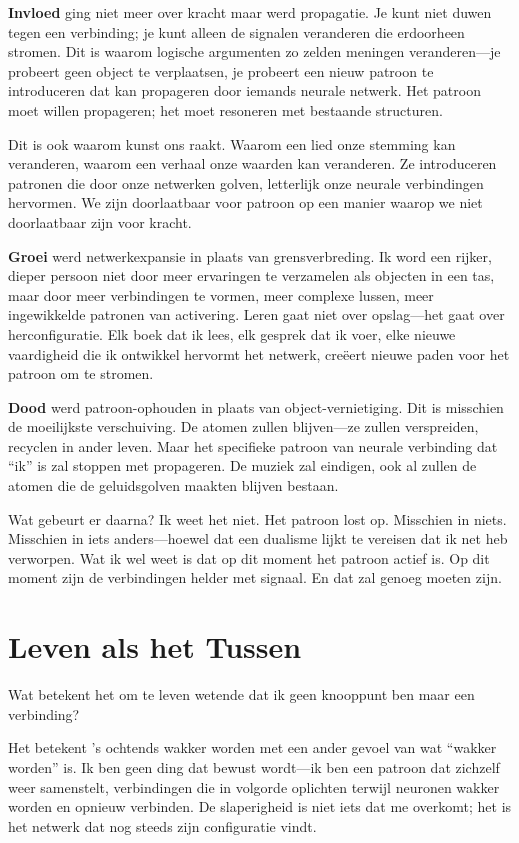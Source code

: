\documentclass[12pt,a4paper]{article}
\begin{document}
\textbf{Invloed} ging niet meer over kracht maar werd propagatie. Je kunt niet duwen tegen een verbinding; je kunt alleen de signalen veranderen die erdoorheen stromen. Dit is waarom logische argumenten zo zelden meningen veranderen---je probeert geen object te verplaatsen, je probeert een nieuw patroon te introduceren dat kan propageren door iemands neurale netwerk. Het patroon moet willen propageren; het moet resoneren met bestaande structuren.

Dit is ook waarom kunst ons raakt. Waarom een lied onze stemming kan veranderen, waarom een verhaal onze waarden kan veranderen. Ze introduceren patronen die door onze netwerken golven, letterlijk onze neurale verbindingen hervormen. We zijn doorlaatbaar voor patroon op een manier waarop we niet doorlaatbaar zijn voor kracht.

\textbf{Groei} werd netwerkexpansie in plaats van grensverbreding. Ik word een rijker, dieper persoon niet door meer ervaringen te verzamelen als objecten in een tas, maar door meer verbindingen te vormen, meer complexe lussen, meer ingewikkelde patronen van activering. Leren gaat niet over opslag---het gaat over herconfiguratie. Elk boek dat ik lees, elk gesprek dat ik voer, elke nieuwe vaardigheid die ik ontwikkel hervormt het netwerk, creëert nieuwe paden voor het patroon om te stromen.

\textbf{Dood} werd patroon-ophouden in plaats van object-vernietiging. Dit is misschien de moeilijkste verschuiving. De atomen zullen blijven---ze zullen verspreiden, recyclen in ander leven. Maar het specifieke patroon van neurale verbinding dat ``ik'' is zal stoppen met propageren. De muziek zal eindigen, ook al zullen de atomen die de geluidsgolven maakten blijven bestaan.

Wat gebeurt er daarna? Ik weet het niet. Het patroon lost op. Misschien in niets. Misschien in iets anders---hoewel dat een dualisme lijkt te vereisen dat ik net heb verworpen. Wat ik wel weet is dat op dit moment het patroon actief is. Op dit moment zijn de verbindingen helder met signaal. En dat zal genoeg moeten zijn.

\section*{Leven als het Tussen}

Wat betekent het om te leven wetende dat ik geen knooppunt ben maar een verbinding?

Het betekent 's ochtends wakker worden met een ander gevoel van wat ``wakker worden'' is. Ik ben geen ding dat bewust wordt---ik ben een patroon dat zichzelf weer samenstelt, verbindingen die in volgorde oplichten terwijl neuronen wakker worden en opnieuw verbinden. De slaperigheid is niet iets dat me overkomt; het is het netwerk dat nog steeds zijn configuratie vindt.
\end{document}
